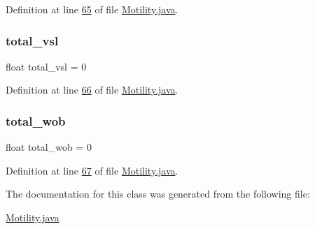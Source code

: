 Definition at line \hyperlink{_motility_8java_source_l00065}{65} of file \hyperlink{_motility_8java_source}{Motility.\+java}.

\hypertarget{classanalysis_1_1_motility_a9fca6ddbc4e27eaf9181320d32dbd631}{}\label{classanalysis_1_1_motility_a9fca6ddbc4e27eaf9181320d32dbd631} 
\subsubsection{\texorpdfstring{total\+\_\+vsl}{total\_vsl}}
{\footnotesize\ttfamily float total\+\_\+vsl = 0\hspace{0.3cm}{\ttfamily [private]}}



Definition at line \hyperlink{_motility_8java_source_l00066}{66} of file \hyperlink{_motility_8java_source}{Motility.\+java}.

\hypertarget{classanalysis_1_1_motility_a8884d2acf5fc9ed45c9b8d775da894ce}{}\label{classanalysis_1_1_motility_a8884d2acf5fc9ed45c9b8d775da894ce} 
\subsubsection{\texorpdfstring{total\+\_\+wob}{total\_wob}}
{\footnotesize\ttfamily float total\+\_\+wob = 0\hspace{0.3cm}{\ttfamily [private]}}



Definition at line \hyperlink{_motility_8java_source_l00067}{67} of file \hyperlink{_motility_8java_source}{Motility.\+java}.



The documentation for this class was generated from the following file\+:\begin{DoxyCompactItemize}
\item 
\hyperlink{_motility_8java}{Motility.\+java}\end{DoxyCompactItemize}
